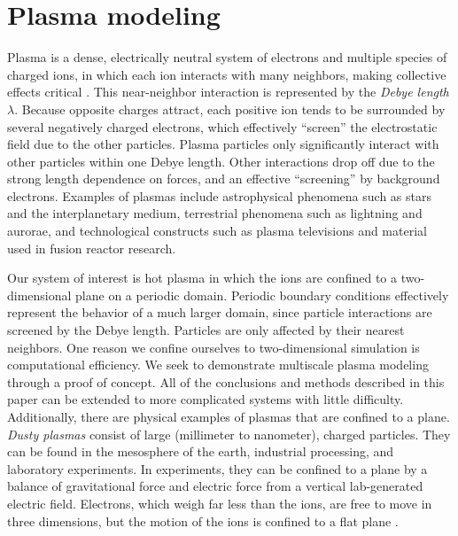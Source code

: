 \documentclass{article}
\begin{document}
\section{Plasma modeling}

Plasma is a dense, electrically neutral system of electrons and multiple species of charged ions, in which each ion interacts with many neighbors, making collective effects critical \cite{sturrock1994plasma}. This near-neighbor interaction is represented by the \emph{Debye length} $\lambda$. Because opposite charges attract, each positive ion tends to be surrounded by several negatively charged electrons, which effectively ``screen'' the electrostatic field due to the other particles. Plasma particles only significantly interact with other particles within one Debye length. Other interactions drop off due to the strong length dependence on forces, and an effective ``screening'' by background electrons. Examples of plasmas include astrophysical phenomena such as stars and the interplanetary medium, terrestrial phenomena such as lightning and aurorae, and technological constructs such as plasma televisions and material used in fusion reactor research.

Our system of interest is hot plasma in which the ions are confined to a two-dimensional plane on a periodic domain. Periodic boundary conditions effectively represent the behavior of a much larger domain, since particle interactions are screened by the Debye length. Particles are only affected by their nearest neighbors. One reason we confine ourselves to two-dimensional simulation is computational efficiency. We seek to demonstrate multiscale plasma modeling through a proof of concept. All of the conclusions and methods described in this paper can be extended to more complicated systems with little difficulty. Additionally, there are physical examples of plasmas that are confined to a plane. \emph{Dusty plasmas} consist of large (millimeter to nanometer), charged particles. They can be found in the mesosphere of the earth, industrial processing, and laboratory experiments. In experiments, they can be confined to a plane by a balance of gravitational force and electric force from a vertical lab-generated electric field. Electrons, which weigh far less than the ions, are free to move in three dimensions, but the motion of the ions is confined to a flat plane \cite{shukla2001introduction}.
\end{document}
